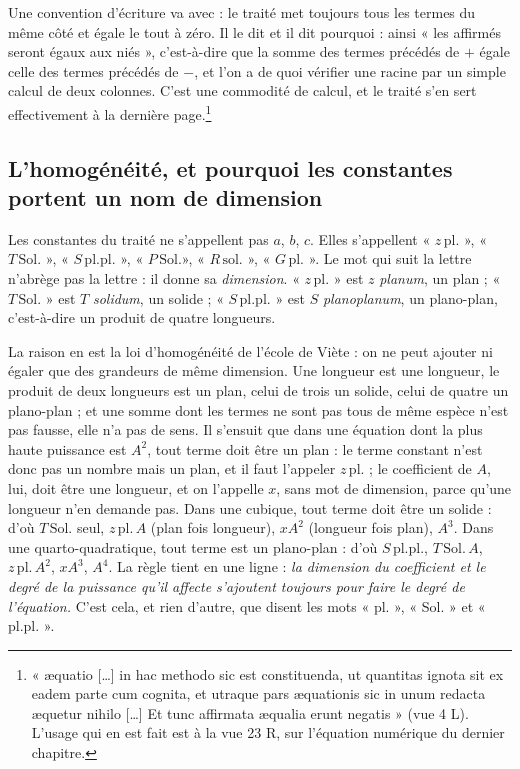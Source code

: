 \documentclass[11pt,a4paper]{article}
\begin{document}
Une convention d'écriture va avec : le traité met toujours tous les termes du
même côté et égale le tout à zéro. Il le dit et il dit pourquoi : ainsi « les
affirmés seront égaux aux niés », c'est-à-dire que la somme des termes précédés
de $+$ égale celle des termes précédés de $-$, et l'on a de quoi vérifier une
racine par un simple calcul de deux colonnes. C'est une commodité de calcul, et
le traité s'en sert effectivement à la dernière page.\footnote{« æquatio […] in
hac methodo sic est constituenda, ut quantitas ignota sit ex eadem parte cum
cognita, et utraque pars æquationis sic in unum redacta æquetur nihilo […] Et
tunc affirmata æqualia erunt negatis » (vue 4 L). L'usage qui en est fait est à
la vue 23 R, sur l'équation numérique du dernier chapitre.}

\subsection*{L'homogénéité, et pourquoi les constantes portent un nom de dimension}

Les constantes du traité ne s'appellent pas $a$, $b$, $c$. Elles s'appellent
« $z\,\mathrm{pl.}$ », « $T\,\mathrm{Sol.}$ », « $S\,\mathrm{pl.pl.}$ »,
« $P\,\mathrm{Sol.} $», « $R\,\mathrm{sol.}$ », « $G\,\mathrm{pl.}$ ». Le mot qui
suit la lettre n'abrège pas la lettre : il donne sa \emph{dimension}.
« $z\,\mathrm{pl.}$ » est $z$ \emph{planum}, un plan ; « $T\,\mathrm{Sol.}$ » est
$T$ \emph{solidum}, un solide ; « $S\,\mathrm{pl.pl.}$ » est $S$
\emph{planoplanum}, un plano-plan, c'est-à-dire un produit de quatre longueurs.

La raison en est la loi d'homogénéité de l'école de Viète : on ne peut ajouter
ni égaler que des grandeurs de même dimension. Une longueur est une longueur, le
produit de deux longueurs est un plan, celui de trois un solide, celui de quatre
un plano-plan ; et une somme dont les termes ne sont pas tous de même espèce
n'est pas fausse, elle n'a pas de sens. Il s'ensuit que dans une équation dont
la plus haute puissance est $A^2$, tout terme doit être un plan : le terme
constant n'est donc pas un nombre mais un plan, et il faut l'appeler
$z\,\mathrm{pl.}$ ; le coefficient de $A$, lui, doit être une longueur, et on
l'appelle $x$, sans mot de dimension, parce qu'une longueur n'en demande pas.
Dans une cubique, tout terme doit être un solide : d'où $T\,\mathrm{Sol.}$ seul,
$z\,\mathrm{pl.}\,A$ (plan fois longueur), $xA^2$ (longueur fois plan), $A^3$.
Dans une quarto-quadratique, tout terme est un plano-plan : d'où
$S\,\mathrm{pl.pl.}$, $T\,\mathrm{Sol.}\,A$, $z\,\mathrm{pl.}\,A^2$, $xA^3$,
$A^4$. La règle tient en une ligne : \emph{la dimension du coefficient et le
degré de la puissance qu'il affecte s'ajoutent toujours pour faire le degré de
l'équation.} C'est cela, et rien d'autre, que disent les mots « pl. », « Sol. »
et « pl.pl. ».
\end{document}
